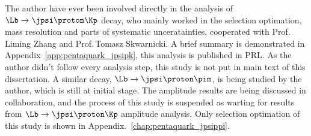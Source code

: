 The author have ever been involved directly in the analysis of $\Lb\to\jpsi\proton\Kp$ decay,
who mainly worked in the selection optimation, mass resolution and parts of systematic unceratainties,
cooperated with Prof.\,Liming Zhang and Prof.\,Tomasz Skwarnicki.
A brief summary is demonstrated in Appendix~\ref{app:pentaquark_jpsipk},
this analysis is published in PRL\supercite{}.
As the author didn't follow every analysis step, 
this study is not put in main text of this dissertation.
A similar decay, $\Lb\to\jpsi\proton\pim$, is being studied by the author, 
which is still at initial stage.
The amplitude results are being discussed in collaboration,
and the process of this study is suspended as warting for results from $\Lb\to\jpsi\proton\Kp$ amplitude analysis.
Only selection optimation of this study is shown in Appendix.~\ref{chap:pentaquark_jpsippi}.









